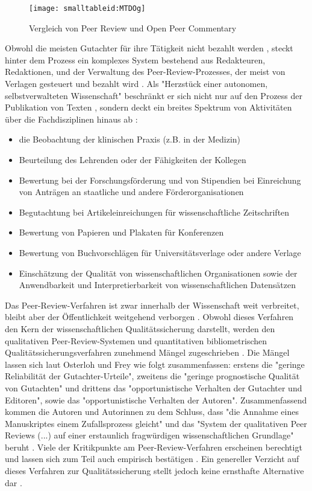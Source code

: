 \begin{figure}[h!]
\texttt{[image: smalltableid:MTDOg]}
\caption{Vergleich von Peer Review und Open Peer Commentary}
\end{figure}

Obwohl die meisten Gutachter für ihre Tätigkeit nicht bezahlt werden \cite{Yiotis_2013}, steckt hinter dem Prozess ein komplexes System bestehend aus Redakteuren, Redaktionen, und der Verwaltung des Peer-Review-Prozesses, der meist von Verlagen gesteuert und bezahlt wird \cite{Bargheer_2015} \cite{Mueller_2009} \cite{Baggs_2006}. Als "Herzstück einer autonomen, selbstverwalteten Wissenschaft" \cite[:5]{Neidhardt_2006} beschränkt er sich nicht nur auf den Prozess der Publikation von Texten \cite{Mueller_2009}, sondern deckt ein breites Spektrum von Aktivitäten über die Fachdisziplinen hinaus ab \cite{Lee_2012}:
\begin{itemize}
\item die Beobachtung der klinischen Praxis (z.B. in der Medizin)
\item Beurteilung des Lehrenden oder der Fähigkeiten der Kollegen
\item Bewertung bei der Forschungsförderung und von Stipendien bei Einreichung von Anträgen an staatliche und andere Förderorganisationen
\item Begutachtung bei Artikeleinreichungen für wissenschaftliche Zeitschriften
\item Bewertung von Papieren und Plakaten für Konferenzen
\item Bewertung von Buchvorschlägen für Universitätsverlage oder andere Verlage
\item Einschätzung der Qualität von wissenschaftlichen Organisationen sowie der Anwendbarkeit und Interpretierbarkeit von wissenschaftlichen Datensätzen
\end{itemize}

Das Peer-Review-Verfahren ist zwar innerhalb der Wissenschaft weit verbreitet, bleibt aber der Öffentlichkeit weitgehend verborgen \cite{Konneker_2013}. Obwohl dieses Verfahren den Kern der wissenschaftlichen Qualitätssicherung darstellt, werden den qualitativen Peer-Review-Systemen und quantitativen bibliometrischen Qualitätssicherungsverfahren zunehmend Mängel zugeschrieben \cite{Peters_2014} \cite{Lee_2012} \cite{Bar_2009} \cite{Osterloh_2008} \cite{Ware_2008} \cite{Smith_2006} \cite{Jansen_2007} \cite{Smith_1999a}. Die Mängel lassen sich laut Osterloh und Frey wie folgt zusammenfassen: erstens die "geringe Reliabilität der Gutachter-Urteile", zweitens die "geringe prognostische Qualität von Gutachten" und drittens das "opportunistische Verhalten der Gutachter und Editoren", sowie das "opportunistische Verhalten der Autoren". Zusammenfassend kommen die Autoren und Autorinnen zu dem Schluss, dass "die Annahme eines Manuskriptes einem Zufallsprozess gleicht" und das "System der qualitativen Peer Reviews (...) auf einer erstaunlich fragwürdigen wissenschaftlichen Grundlage" beruht \cite{Osterloh_2008}. Viele der Kritikpunkte am Peer-Review-Verfahren erscheinen berechtigt und lassen sich zum Teil auch empirisch bestätigen \cite{Mueller_2009}. Ein genereller Verzicht auf dieses Verfahren zur Qualitätssicherung stellt jedoch keine ernsthafte Alternative dar \cite{Smith_2006}.

